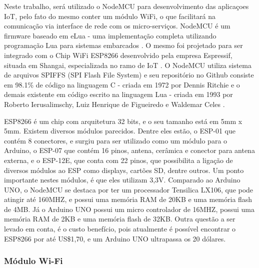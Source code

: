 \documentclass[journal]{IEEEtran}
\begin{document}
Neste trabalho, será utilizado o NodeMCU para desenvolvimento das aplicaçoes IoT, pelo fato do mesmo conter um módulo WiFi, o que facilitará na comunicação via interface de rede com os micro-serviços. NodeMCU é um firmware baseado em eLua - uma implementação completa utilizando programação Lua para sistemas embarcados \cite{elua2017}. O mesmo foi projetado para ser integrado com o Chip WiFi ESP8266 desenvolvido pela empresa Espressif, situada em Shangai, especializada no ramo de IoT \cite{systems}. O NodeMCU utiliza sistema de arquivos SPIFFS (SPI Flash File System) e seu repositório no Github consiste em 98.1\% de código na linguagem C - criada em 1972 por Dennis Ritchie \cite{williamstewart2017} e o demais existente em código escrito na linguagem Lua  - criada em 1993 por Roberto Ierusalimschy, Luiz Henrique de Figueiredo e Waldemar Celes \cite{lua2017Authors}.

ESP8266 é um chip com arquitetura 32 bits, e o seu tamanho está em 5mm x 5mm. Existem diversos módulos parecidos. Dentre eles estão, o ESP-01 que contém 8 conectores, e surgiu para ser utilizado como um módulo para o Arduino, o ESP-07 que contém 16 pinos, antena, cerâmica e conector para antena externa, e o ESP-12E, que conta com 22 pinos, que possibilita a ligação de diversos módulos ao ESP como displays, cartões SD, dentre outros. Um ponto importante nestes módulos, é que eles utilizam 3,3V. Comparado ao Arduino UNO, o NodeMCU se destaca por ter um processador Tensilica LX106, que pode atingir até 160MHZ, e possui uma memória RAM de 20KB e uma memória flash de 4MB. Já o Arduino UNO possui um micro controlador de 16MHZ, possui uma memória RAM de 2KB e uma memória flash de 32KB. Outra questão a ser levado em conta, é o custo benefício, pois atualmente é possível encontrar o ESP8266 por até US\$1,70, e um Arduino UNO ultrapassa os 20 dólares\cite{IrvingNodeMCU}.



\subsubsection{Módulo Wi-Fi}
\end{document}

